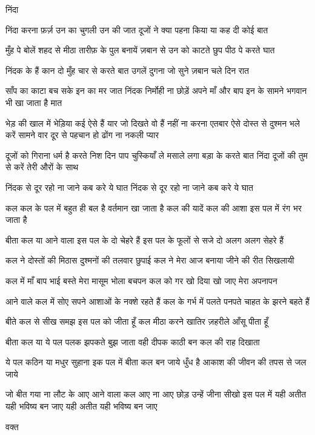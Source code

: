 निंदा

निंदा करना फ़र्ज़ उन का 
चुगली उन की जात
दूजों ने क्या पहना किया
या कह दी कोई बात



मुँह पे बोलें शहद से मीठा 
तारीफ़ के पुल बनायें
ज़बान से उन को काटते
 छुप पीठ पे करते घात



निंदक के हैं कान दो
 मुँह चार से करते बात
उगलें दुगना जो सुने 
ज़बान चले दिन रात





साँप का काटा बच सके
 इन का मर जात
निंदक निर्मोही ना छोड़ें 
अपने माँ और बाप
इन के सामने भगवान भी 
खा जाता है मात



भेड़ की खाल में भेड़िया
 कई ऐसे हैं यार
जो दिखते वो हैं नहीं
 ना करना एतबार
ऐसे दोस्त से दुश्मन भले
 करें सामने वार
दूर से पहचान हो 
ढोंग ना नकली प्यार



दूजों को गिराना धर्म है 
करते निश दिन पाप
चुस्कियाँ ले मसाले लगा 
बड़ा के करते बात
निंदा दूजों की तुम से करें
 तेरी औरों के साथ




निंदक से दूर रहो ना जाने 
कब करे ये घात
निंदक से दूर रहो ना जाने 
कब करे ये घात



कल
कल के पल में बहुत ही बल है
वर्तमान खा जाता है
कल की यादें कल की आशा
इस पल में रंग भर जाता है

बीता कल या आने वाला
इस पल के दो चेहरे हैं
इस पल के फूलों से सजे
दो अलग अलग सेहरे हैं


कल ने दोस्तों की मिठास
दुश्मनों की तलवार छुपाई
कल ने मेरा आज बनाया
जीने की रीत सिखलायी

कल में माँ बाप भाई बस्ते
मेरा मासूम भोला बचपन
कल को गर खो दिया
खो जाए मेरा अपनापन

आने वाले कल में सोए सपने
आशाओं के नक्शे रहते हैं
कल के गर्भ में पलते पनपते
चाहत के झरने बहते हैं

बीते कल से सीख समझ
इस पल को जीता हूँ
कल मीठा करने खातिर
ज़हरीले आँसू पीता हूँ


बीता कल या ये पल
पलक झपकते बुझ जाता
वही दीपक काठी बन
कल की राह दिखाता

ये पल कठिन या मधुर सुहाना
इक पल में बीता कल बन जाये
धुँध है आकाश की
जीवन की तपस से जल जाये

जो बीत गया ना लौट के आए
आने वाला कल आए ना आए
छोड़ उन्हें जीना सीखो इस पल में
यही अतीत यही भविष्य बन जाए
यही अतीत यही भविष्य बन जाए

वक्त

